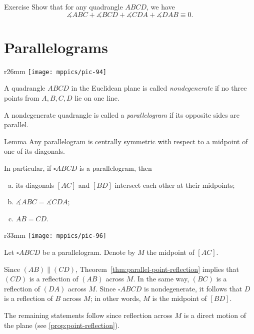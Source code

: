 \begin{thm}{Exercise}\label{ex:quadrangle}
Show that for any quadrangle $ABCD$, we have
$$\measuredangle ABC+\measuredangle BCD+\measuredangle CDA+\measuredangle DAB\equiv 0.$$

\end{thm}

\pagebreak%



\section{Parallelograms}

{

\begin{wrapfigure}{r}{26mm}
\vskip-10mm
\centering
\texttt{[image: mppics/pic-94]}
\end{wrapfigure}

A quadrangle $ABCD$ in the Euclidean plane is called \emph{nondegenerate} if no three points from $A,B,C,D$ lie on one line.

}

A nondegenerate quadrangle  is called a \emph{parallelogram}
if its opposite sides are parallel.



\begin{thm}{Lemma}\label{lem:parallelogram}
Any parallelogram is centrally symmetric with respect to a midpoint of one of its diagonals.

In particular, if $\square A B C D$ is a parallelogram, then
\begin{enumerate}[(a)]
\item its diagonals $[AC]$ and $[BD]$ intersect each other at their midpoints;
\item $\measuredangle A B C= \measuredangle C D A$;
\item $AB=CD$.
\end{enumerate}
\end{thm}

{

\begin{wrapfigure}{r}{33mm}
\centering
\texttt{[image: mppics/pic-96]}
\end{wrapfigure}

 Let $\square A B C D$ be a parallelogram.
Denote by $M$ the midpoint of $[AC]$.

Since $(AB)\parallel (CD)$, Theorem~\ref{thm:parallel-point-reflection} implies that $(CD)$ is a reflection of $(AB)$ across $M$.
In the same way, $(BC)$ is a reflection of $(DA)$ across $M$.
Since $\square A B C D$ is nondegenerate, it follows that $D$ is a reflection of $B$ across $M$; in other words, $M$ is the midpoint of $[BD]$.

The remaining statements follow since reflection across $M$ is a direct motion of the plane (see \ref{prop:point-reflection}).
\qeds

}

